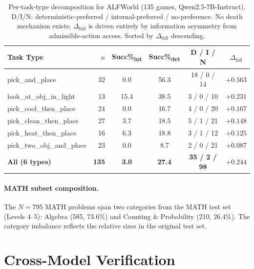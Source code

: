 \documentclass[11pt]{article}
\begin{document}
\begin{table}[h]
\centering
\scriptsize
\setlength{\tabcolsep}{2.5pt}
\begin{tabular}{@{}lrcccc@{}}
\toprule
Task Type & $n$ & Succ\%\textsubscript{int} & Succ\%\textsubscript{det} & D / I / N & $\Delta_{\text{full}}$ \\
\midrule
pick\_and\_place       & 32 & 0.0  & 56.3 & 18 / 0 / 14 & $+0.563$ \\
look\_at\_obj\_in\_light & 13 & 15.4 & 38.5 & 3 / 0 / 10  & $+0.231$ \\
pick\_cool\_then\_place & 24 & 0.0  & 16.7 & 4 / 0 / 20  & $+0.167$ \\
pick\_clean\_then\_place & 27 & 3.7  & 18.5 & 5 / 1 / 21  & $+0.148$ \\
pick\_heat\_then\_place & 16 & 6.3  & 18.8 & 3 / 1 / 12  & $+0.125$ \\
pick\_two\_obj\_and\_place & 23 & 0.0 & 8.7  & 2 / 0 / 21  & $+0.087$ \\
\midrule
\textbf{All (6 types)} & \textbf{135} & \textbf{3.0} & \textbf{27.4} & \textbf{35 / 2 / 98} & $\mathbf{+0.244}$ \\
\bottomrule
\end{tabular}
\caption{Per-task-type decomposition for ALFWorld (135 games, Qwen2.5-7B-Instruct). D/I/N: deterministic-preferred / internal-preferred / no-preference. No death mechanism exists; $\Delta_{\text{full}}$ is driven entirely by information asymmetry from admissible-action access. Sorted by $\Delta_{\text{full}}$ descending.}
\label{tab:alfworld-pertask}
\end{table}

\paragraph{MATH subset composition.}
The $N{=}795$ MATH problems span two categories from the MATH test set~\citep{math-2021} (Levels 4--5): Algebra (585, 73.6\%) and Counting \& Probability (210, 26.4\%). The category imbalance reflects the relative sizes in the original test set.

\section{Cross-Model Verification}
\label{app:cross-model}
\end{document}
